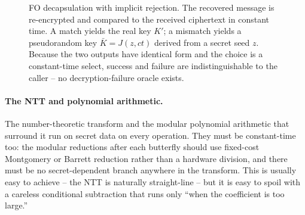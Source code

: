 \begin{figure}[t]
\centering
{}
\caption{FO decapsulation with implicit rejection. The recovered message is
re-encrypted and compared to the received ciphertext in constant time. A match yields
the real key $K'$; a mismatch yields a pseudorandom key $\bar K = J(z,ct)$ derived
from a secret seed $z$. Because the two outputs have identical form and the choice is
a constant-time select, success and failure are indistinguishable to the caller -- no
decryption-failure oracle exists.}
\label{fig:fo-implicit}
\end{figure}

\paragraph{The NTT and polynomial arithmetic.}
The number-theoretic transform and the modular polynomial arithmetic that surround it
run on secret data on every operation. They must be constant-time too: the modular
reductions after each butterfly should use fixed-cost Montgomery or Barrett reduction
rather than a hardware division, and there must be no secret-dependent branch anywhere
in the transform. This is usually easy to achieve -- the NTT is naturally
straight-line -- but it is easy to spoil with a careless conditional subtraction that
runs only ``when the coefficient is too large.''

